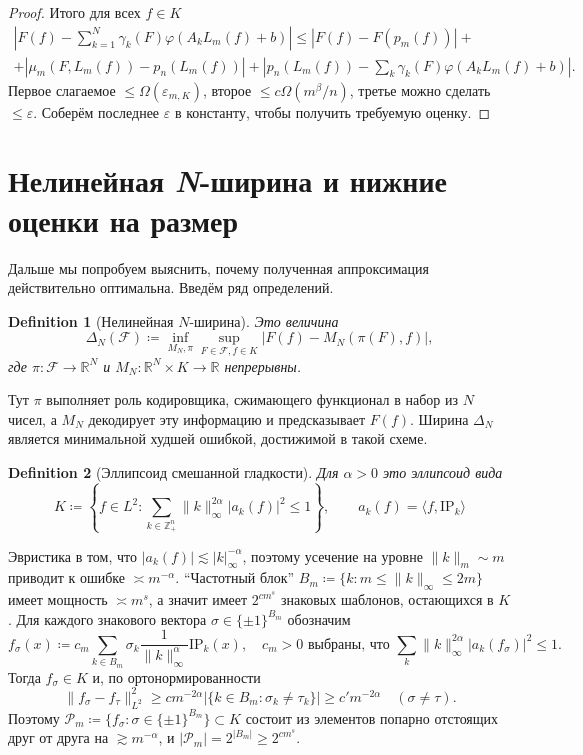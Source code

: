 \documentclass[12pt]{article}
\newtheorem{definition}{Definition}
\begin{document}
\begin{proof}
  Итого для всех \(f \in K\)
  \begin{multline*}
    \left| F(f) - \sum_{k=1}^{N} \gamma_k(F) \varphi(A_k L_m(f) + b) \right| \le |F(f) - F(p_m(f))| + \\
    + |\mu_m(F, L_m(f)) - p_n(L_m(f))| + \left| p_n(L_m(f)) - \sum_{k} \gamma_k(F) \varphi(A_k L_m(f) + b) \right|.
  \end{multline*}
  Первое слагаемое \(\le \Omega(\varepsilon_{m,K})\), второе \(\le c\Omega(m^\beta / n)\), третье можно сделать \(\le \varepsilon\).
  Соберём последнее \(\varepsilon\) в константу, чтобы получить требуемую оценку.
\end{proof}

\section{Нелинейная \textit{N}-ширина и нижние оценки на размер}
Дальше мы попробуем выяснить, почему полученная аппроксимация действительно оптимальна.
Введём ряд определений.
\begin{definition}[Нелинейная \(N\)-ширина]
  Это величина
  \[\Delta_N(\mathcal{F}) \coloneq \inf_{M_N, \pi} \sup_{F \in \mathcal{F}, f \in K} |F(f) - M_N(\pi(F), f)|,\]
  где \(\pi\colon \mathcal{F} \to \mathbb{R}^N\) и \(M_N\colon \mathbb{R}^N \times K \to \mathbb{R}\) непрерывны.
\end{definition}
Тут \(\pi\) выполняет роль кодировщика, сжимающего функционал в набор из \(N\) чисел, а \(M_N\) декодирует эту информацию и предсказывает \(F(f)\).
Ширина \(\Delta_N\) является минимальной худшей ошибкой, достижимой в такой схеме.
\begin{definition}[Эллипсоид смешанной гладкости]
  Для \(\alpha > 0\) это эллипсоид вида
  \[K \coloneq \left\{ f \in L^2 : \sum_{k \in \mathbb{Z}_+^n} \|k\|_\infty^{2\alpha} |a_k(f)|^2 \le 1 \right\}, \qquad a_k(f) = \langle f, \mathrm{IP}_k \rangle\]
\end{definition}
Эвристика в том, что \(|a_k(f)| \lesssim |k|_\infty^{-\alpha}\), поэтому усечение на уровне \(\|k\|_m \sim m\) приводит к ошибке \(\asymp m^{-\alpha}\).
``Частотный блок'' \(B_m \coloneq \{k : m \le \|k\|_\infty \le 2m\}\) имеет мощность \(\asymp m^s\), а значит имеет \(2^{cm^s}\) знаковых шаблонов, остающихся в \(K\).
Для каждого знакового вектора \(\sigma \in \{\pm 1\}^{B_m}\) обозначим
\[f_\sigma(x) \coloneq c_m \sum_{k \in B_m} \sigma_k \frac{1}{\|k\|_\infty^\alpha} \mathrm{IP}_k(x), \quad c_m > 0 \text{ выбраны, что } \sum_k \|k\|_\infty^{2\alpha} |a_k(f_\sigma)|^2 \le 1.\]
Тогда \(f_\sigma \in K\) и, по ортонормированности
\[\|f_\sigma - f_\tau\|_{L^2}^2 \ge c m^{-2\alpha} |\{ k \in B_m : \sigma_k \neq \tau_k \}| \ge c' m^{-2\alpha} \quad (\sigma \neq \tau).\]
Поэтому \(\mathcal{P}_m \coloneq \{ f_\sigma : \sigma \in \{\pm 1\}^{B_m} \} \subset K\) состоит из элементов попарно отстоящих друг от друга на \(\gtrsim m^{-\alpha}\), и \(|\mathcal{P}_m| = 2^{|B_m|} \geq 2^{c m^s}\).
\end{document}
